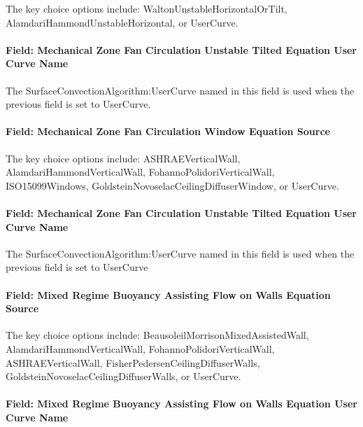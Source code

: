 The key choice options include: WaltonUnstableHorizontalOrTilt, AlamdariHammondUnstableHorizontal, or UserCurve.

\paragraph{Field: Mechanical Zone Fan Circulation Unstable Tilted Equation User Curve Name}\label{field-mechanical-zone-fan-circulation-unstable-tilted-equation-user-curve-name}

The SurfaceConvectionAlgorithm:UserCurve named in this field is used when the previous field is set to UserCurve.

\paragraph{Field: Mechanical Zone Fan Circulation Window Equation Source}\label{field-mechanical-zone-fan-circulation-window-equation-source}

The key choice options include: ASHRAEVerticalWall, AlamdariHammondVerticalWall, FohannoPolidoriVerticalWall, ISO15099Windows, GoldsteinNovoselacCeilingDiffuserWindow, or UserCurve.

\paragraph{Field: Mechanical Zone Fan Circulation Unstable Tilted Equation User Curve Name}\label{field-mechanical-zone-fan-circulation-unstable-tilted-equation-user-curve-name-1}

The SurfaceConvectionAlgorithm:UserCurve named in this field is used when the previous field is set to UserCurve

\paragraph{Field: Mixed Regime Buoyancy Assisting Flow on Walls Equation Source}\label{field-mixed-regime-buoyancy-assisting-flow-on-walls-equation-source}

The key choice options include: BeausoleilMorrisonMixedAssistedWall, AlamdariHammondVerticalWall, FohannoPolidoriVerticalWall, ASHRAEVerticalWall, FisherPedersenCeilingDiffuserWalls, GoldsteinNovoselacCeilingDiffuserWalls, or UserCurve.

\paragraph{Field: Mixed Regime Buoyancy Assisting Flow on Walls Equation User Curve Name}\label{field-mixed-regime-buoyancy-assisting-flow-on-walls-equation-user-curve-name}

